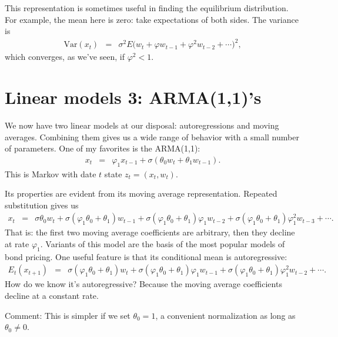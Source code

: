 \documentclass[11pt]{article}
\begin{document}
This representation is sometimes useful in finding the equilibrium distribution.
For example, the mean here is zero:  take expectations of both sides.
The variance is
\begin{eqnarray*}
    \mbox{Var} (x_{t})
            &=& \sigma^2 E  \big( w_t + \varphi w_{t-1} + \varphi^2 w_{t-2}
                + \cdots \big)^2 , %
\end{eqnarray*}
which converges, as we've seen, if $\varphi^2 < 1$.


\section{Linear models 3:  ARMA(1,1)'s}


We now have two linear models at our disposal:  autoregressions and moving averages.
Combining them gives us a wide range of behavior with a small number
of parameters.
One of my favorites is the ARMA(1,1):
\begin{eqnarray*}
    x_t &=& \varphi_1 x_{t-1} + \sigma \left( \theta_0 w_t + \theta_1 w_{t-1} \right) .
\end{eqnarray*}
This is Markov with date $t$ state $z_{t} = (x_t,w_t)$.


Its properties are evident from its moving average representation.
Repeated substitution gives us
\begin{eqnarray*}
    x_t &=&  \sigma \theta_0 w_t + \sigma (\varphi_1\theta_0+ \theta_1) w_{t-1}
                + \sigma (\varphi_1\theta_0+ \theta_1)\varphi_1 w_{t-2}
                + \sigma (\varphi_1\theta_0+ \theta_1)\varphi_1^2 w_{t-3} + \cdots .
\end{eqnarray*}
That is:  the first two moving average coefficients are arbitrary,
then they decline at rate $\varphi_1$.
Variants of this model are the basis of the most popular models of bond pricing.
One useful feature is that its conditional mean is autoregressive:
\begin{eqnarray*}
  E_t ( x_{t+1} ) &=&  \sigma (\varphi_1\theta_0+ \theta_1) w_{t}
                + \sigma (\varphi_1\theta_0+ \theta_1)\varphi_1 w_{t-1}
                + \sigma (\varphi_1\theta_0+ \theta_1)\varphi_1^2 w_{t-2} + \cdots .
\end{eqnarray*}
How do we know it's autoregressive?
Because the moving average coefficients decline at a constant rate.

Comment:  This is simpler if we set $\theta_0 = 1$, a convenient normalization
as long as $\theta_0 \neq 0$.
\end{document}
